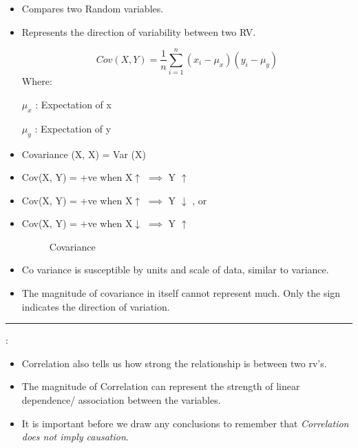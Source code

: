 \documentclass[	DIV=calc,%
paper=a4,%
fontsize=11pt,%
twocolumn]{scrartcl} %
\newcommand{\hformbar}[1]{\vspace{5pt}\hrule\vspace{10pt}} %
\newcommand{\formdesc}[1]{\noindent\textbf{#1}}
\begin{document}
\begin{itemize}
	\item Compares two Random variables.
	\item Represents the direction of variability between two RV.
	
	\begin{equation}
	Cov(X, Y) = \frac{1}{n} \sum_{i=1}^{n} (x_i-\mu_x) (y_i-\mu_y)
	\end{equation}
Where:

$\mu_x$ : Expectation of x

$\mu_y$ : Expectation of y

\item Covariance (X, X) = Var (X)
\item Cov(X, Y) = +ve when X$\uparrow$ $\implies$ Y $\uparrow$
\item Cov(X, Y) = +ve when X$\uparrow$ $\implies$ Y $\downarrow$ , or
\item Cov(X, Y) = +ve when X$\downarrow$ $\implies$ Y $\uparrow$

\begin{figure}[ht!]
	\centering
	\graphicspath{ {images/math/} }
	\caption{Covariance }
	
\end{figure}

\item Co variance is susceptible by units and scale of data, similar to variance.
\item The magnitude of covariance in itself cannot represent much. Only the sign indicates the direction of variation.
\end{itemize}

\break

\hformbar

\formdesc{Correlation}:

\begin{itemize}
	\item Correlation also tells us how strong the relationship is between two rv's.
	\item The magnitude of Correlation can represent the strength of linear dependence/ association between the variables.
	\item It is important before we draw any conclusions to remember that \emph{Correlation does not imply causation}.
\end{itemize}
\end{document}
